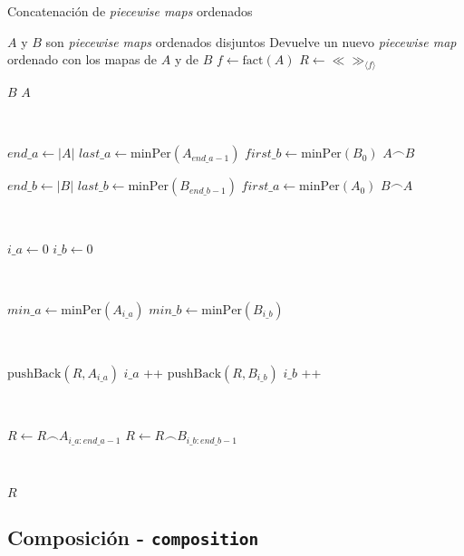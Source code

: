 \begin{algorithm}
\caption{Concatenación de \textit{piecewise maps} ordenados}
\label{alg:concatenation-ord}
\begin{algorithmic}[1]
\Require $A$ y $B$ son \textit{piecewise maps} ordenados disjuntos
\Ensure Devuelve un nuevo \textit{piecewise map} ordenado con los mapas de $A$ y de $B$
    \State $f \gets \mathrm{fact}(A)$
    \State $R \gets \ll\gg_{\langle f \rangle}$ 

        \State \Return $B$
    \EndIf
        \State \Return$A$
    \EndIf
    
 \

    \State $end\_a \gets |A|$
    \State $last\_a \gets \mathrm{minPer}(A_{end\_a-1})$
    \State $first\_b \gets \mathrm{minPer}(B_0)$
        \State \Return $A \frown B$
    \EndIf

    \State $end\_b \gets |B|$
    \State $last\_b \gets \mathrm{minPer}(B_{end\_b-1})$
    \State $first\_a \gets \mathrm{minPer}(A_0)$
       \State \Return $B \frown A$
    \EndIf

 \

    \State $i\_a  \gets 0$
    \State $i\_b  \gets 0$

    
 \

        \State $min\_a \gets \mathrm{minPer}(A_{i\_a})$
        \State $min\_b \gets \mathrm{minPer}(B_{i\_b})$

 \

        \State $ \mathrm{pushBack} (R, A_{i\_a})$
        \State $i\_a$ \!+\!+
      \Else 
        \State $\mathrm{pushBack} (R, B_{i\_b})$
        \State $i\_b$ \!+\!+
      \EndIf   
    \EndFor
    
    \
    
    \State $R \gets R \frown A_{i\_a:end\_a - 1}$
    \State $R \gets R \frown B_{i\_b:end\_b - 1}$
    
    \
    
    \State \Return $R$
\EndFunction
\end{algorithmic}
\end{algorithm}



\subsection{Composición - \texttt{composition}}


